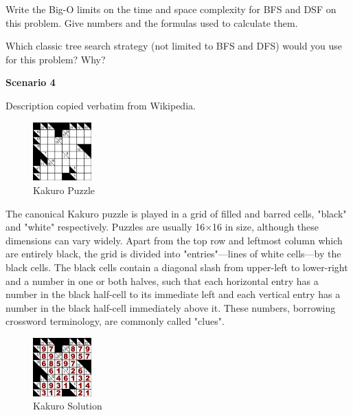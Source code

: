 \documentclass[11pt]{article}
\begin{document}
\begin{problem}{8}

  Write the Big-O limits on the time and space complexity for BFS and DSF on this problem.  Give numbers and the formulas used to calculate them.
  
  \vspace*{1in}
  
\end{problem}

\begin{problem}{2}

  Which classic tree search strategy (not limited to BFS and DFS) would you use for this problem?
  Why?
  
  \vspace*{1in}
  
\end{problem}




\newpage
\textbf{Scenario 4}

Description copied verbatim from Wikipedia.

\begin{figure}
  \vspace{-22pt}
  \begin{center}
    \includegraphics[width=0.20\textwidth]{250px-Kakuro_black_box.png}
  \end{center}
  \vspace{-20pt}
  \caption{Kakuro Puzzle}
\end{figure}
The canonical Kakuro puzzle is played in a grid of filled and barred cells, "black" and "white" respectively. Puzzles are usually 16×16 in size, although these dimensions can vary widely. Apart from the top row and leftmost column which are entirely black, the grid is divided into "entries"—lines of white cells—by the black cells. The black cells contain a diagonal slash from upper-left to lower-right and a number in one or both halves, such that each horizontal entry has a number in the black half-cell to its immediate left and each vertical entry has a number in the black half-cell immediately above it. These numbers, borrowing crossword terminology, are commonly called "clues".
\begin{figure}
  \vspace{-22pt}
  \begin{center}
    \includegraphics[width=0.20\textwidth]{250px-Kakuro_black_box_solution.png}
  \end{center}
  \vspace{-20pt}
  \caption{Kakuro Solution}
\end{figure}
\end{document}
